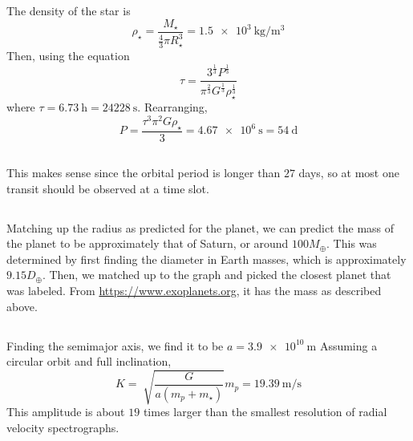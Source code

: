 \documentclass{article}
\begin{document}
\subsection{}

The density of the star is
\begin{equation}
    \rho_\star = \frac{M_\star}{\frac{4}{3} \pi R_\star^3} = \SI{1.5e+3}{\kilogram\per\meter\cubed}
\end{equation}
Then, using the equation
\begin{equation}
    \tau = \frac{3^{\frac{1}{3}} P^{\frac{1}{3}}}{\pi^{\frac{2}{3}} G^{\frac{1}{3}} \rho_\star^{\frac{1}{3}}}
\end{equation}
where \(\tau = \SI{6.73}{\hour} = \SI{24228}{\second}\).
Rearranging,
\begin{equation}
    P = \frac{\tau^3 \pi^2 G \rho_\star}{3} = \SI{4.67e+6}{\second} = \SI{54}{\day}
\end{equation}

\subsection{}

This makes sense since the orbital period is longer than \(27\) days, so at most one transit should be observed at a time slot.

\subsection{}

Matching up the radius as predicted for the planet, we can predict the mass of the planet to be approximately that of Saturn, or around \(100 M_\oplus\).
This was determined by first finding the diameter in Earth masses, which is approximately \(9.15 D_\oplus\).
Then, we matched up to the graph and picked the closest planet that was labeled.
From \url{https://www.exoplanets.org}, it has the mass as described above.

\subsection{}

Finding the semimajor axis, we find it to be \(a = \SI{3.9e+10}{\meter}\)
Assuming a circular orbit and full inclination,
\begin{equation}
    K = \sqrt[]{\frac{G}{a (m_p + m_\star)}} m_p = \SI{19.39}{\meter\per\second}
\end{equation}
This amplitude is about \(19\) times larger than the smallest resolution of radial velocity spectrographs.
\end{document}
